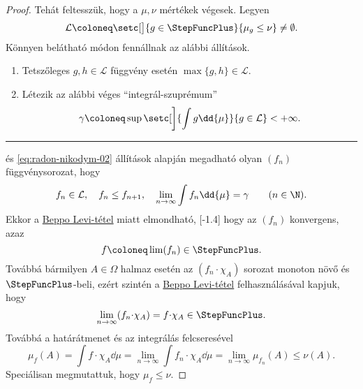 \documentclass[
]{elteikthesis}[2024/04/26]
\begin{document}
	\begin{proof}
		Tehát feltesszük, hogy a \( \mu, \nu \) mértékek végesek.
		Legyen
		\[
			\mathcal{L} \coloneq 
			\setc[\big]{ g \in \StepFuncPlus }{ \mu_g \leq \nu } \neq \emptyset.
		\]
		Könnyen belátható módon fennállnak az alábbi állítások.
		\begin{enumerate}
			\item\label{eq:radon-nikodym-01}
			Tetszőleges \( g, h \in \mathcal{L} \) függvény esetén
			\( \max \{ g, h \} \in \mathcal{L} \).
			
			\item\label{eq:radon-nikodym-02}
			Létezik az alábbi véges ``integrál-szuprémum''
			\[
				\gamma \coloneq 
				\sup \setc[\bigg]{ \int g \dd{\mu} }{ g \in \mathcal{L} } < +\infty.
			\]
		\end{enumerate}
		
		\vspace{-6pt}
		\hrule
		\vspace{9pt}
		
		 és \ref{eq:radon-nikodym-02} állítások alapján 
		megadható olyan	\( (f_n) \) függvénysorozat, hogy
		\[
			f_n \in \mathcal{L}, \quad 
			f_n \leq f_{n + 1}, \quad
			\lim_{n \to \infty} \int f_n \dd{\mu} = \gamma 
			\qquad (n \in \N).
		\]
		Ekkor a \hyperref[th:beppo-levi]{Beppo Levi-tétel} miatt elmondható,
		[-1.4\baselineskip]
		hogy az \( (f_n) \) konvergens, azaz
		\[
			f \coloneq \lim(f_n) \in \StepFuncPlus.
		\]
		Továbbá bármilyen \( A \in \Omega \) halmaz esetén az \( (f_n {\cdot} \chi_A) \) sorozat monoton növő és \( \StepFuncPlus \)-beli, ezért szintén a 
		\hyperref[th:beppo-levi]{Beppo Levi-tétel} felhasználásával kapjuk, hogy
		\[
			\lim_{n \to \infty} (f_n {\cdot} \chi_A ) = 
			f { \cdot } \chi_A \in \StepFuncPlus.
		\]
		Továbbá a határátmenet és az integrálás felcseresével
		\[
			\mu_f(A) = 
			\int f {\cdot} \chi_A \dd{\mu} =
			\lim_{n \to \infty} \int f_n {\cdot} \chi_A \dd{\mu} =
			\lim_{n \to \infty} \mu_{f_n}(A) \leq
			\nu(A).
		\]
		Speciálisan megmutattuk, hogy \( \mu_f \leq \nu \).
		

\end{proof}
\end{document}
